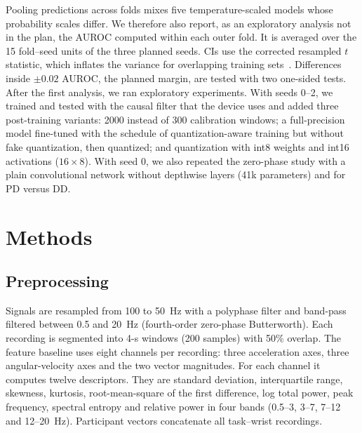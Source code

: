 \documentclass[journal,twoside,web]{ieeecolor}
\begin{document}
Pooling predictions across folds mixes five temperature-scaled models whose probability scales differ. We therefore also report, as an exploratory analysis not in the plan, the AUROC computed within each outer fold. It is averaged over the 15 fold--seed units of the three planned seeds. CIs use the corrected resampled $t$ statistic, which inflates the variance for overlapping training sets~\cite{Nadeau2003}. Differences inside $\pm0.02$ AUROC, the planned margin, are tested with two one-sided tests. After the first analysis, we ran exploratory experiments. With seeds 0--2, we trained and tested with the causal filter that the device uses and added three post-training variants: 2000 instead of 300 calibration windows; a full-precision model fine-tuned with the schedule of quantization-aware training but without fake quantization, then quantized; and quantization with int8 weights and int16 activations ($16\times8$). With seed 0, we also repeated the zero-phase study with a plain convolutional network without depthwise layers (41k parameters) and for PD versus DD.

\section{Methods}
\subsection{Preprocessing}
Signals are resampled from 100 to 50~Hz with a polyphase filter and band-pass filtered between 0.5 and 20~Hz (fourth-order zero-phase Butterworth). Each recording is segmented into 4-s windows (200 samples) with 50\% overlap. The feature baseline uses eight channels per recording: three acceleration axes, three angular-velocity axes and the two vector magnitudes. For each channel it computes twelve descriptors. They are standard deviation, interquartile range, skewness, kurtosis, root-mean-square of the first difference, log total power, peak frequency, spectral entropy and relative power in four bands (0.5--3, 3--7, 7--12 and 12--20~Hz). Participant vectors concatenate all task--wrist recordings.
\end{document}

